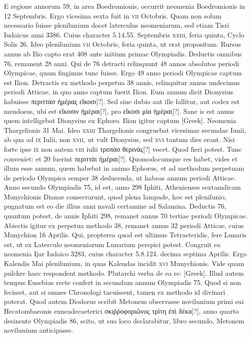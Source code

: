 E regione annorum 59, in area Boedromionis,
occurrit neomenia Boedromionis in 12 Septembris.
Ergo vicesima
sexta fuit in \textsc{vii} Octobris.
Quam non solum necessario fuisse
plenilunium docet laterculus neomeniarum, sed etiam Tisri Iudaicus
anni 3386.
Cuius character 5.14.55. Septembris \textsc{xxiii}, feria quinta,
Cyclo Solis 26.
Ideo plenilunium \textsc{vii} Octobris, feria quinta, ut
erat propositum.
Rursus annus ab Ilio capto erat 408 ante initium
primae Olympiadis.
Deductis omnibus 76, remanent 28 anni.
Qui de 76 detracti relinquunt 48 annos absolutos periodi Olympicae,
quam fingimus tunc fuisse.
Ergo 49 anno periodi Olympicae captum
est Ilion.
Detractis ex methodo perpetua 38 annis, relinquitur annus
undecimus periodi Atticae, in quo anno captum fuerit Ilion.
Eum
annum dicit Dionysius habuisse \textgreek{περιττὰσ ἡμέρας εἴκοσι[?]}.
Sed sine dubio
aut ille fallitur, aut codex est mendosus, ubi est
 \textgreek{εἴκοσιν ἡμέραι[?]}, pro
\textgreek{εἴκοσι μία ἡμέραι[?]}.
Sane is est annus quem intelligebat Dionysius ex
Ephoro.
Ilion igitur captum \textgreek{[Greek]}.
Neomenia Thargelionis 31 Mai.
Ideo \textsc{xxiii} Thargelionis congruebat vicesimae
secundae Iunii, ab qua ad \textsc{ix} Iulii, non \textsc{xvii},
 ut vult Dionysius,
sed \textsc{xvi} tantum dies erant.
Nisi forte ipse \textsc{ix} non autem \textsc{viii} iulii
\textgreek{τροπὰσ θερινὰς[?]} vocet.
Quod fieri potest.
Tunc conveniet: et 20 fuerint
\textgreek{περιττὰι ἡμέραι[?]}.
Quomodocumque res habet, vides et illum esse
annum, quem habebat in animo Ephorus, et ad methodum perpetuam
de periodo Olympica semper 38 deducenda, ut habeas annum
periodi Atticae.
Anno secundo Olympiadis 75, id est, anno 298 Iphiti,
Athenienses sextamdicam Munychionis Dianae consecrarunt,
quod plena lampade, hoc est plenilunio, pugnatum est eo die illius
anni navali certamine ad Salamina.
Deductis 76, quantum potest,
de annis Iphiti 298, remanet annus 70 tertiae periodi Olympicae.
Abiectis igitur ex perpetua methodo 38, remanet annus 32 periodi
Atticae, cuius Munychion 16 Aprilis.
Qui, propterea quod est ultimus
Tetraeteridis, fere Lunaris est, ut ex Laterculo neomeniarum
Lunarium perspici potest.
Congruit ea neomenia Ijar Iudaico 3283,
cuius character 5.8.124. decima septima Aprilis.
Ergo Kalendis
Mai plenilunium, in quas Kalendas incidit \textsc{xvi} Munychionis.
Vide quam pulchre haec respondent methodo.
Plutarchi verba de
ea re: \textgreek{[Greek]}.
Illud autem tempus Eusebius
recte confert in secundum annum Olympiadis 75.
Quod
si non fecisset, aut si omnes Chronologi tacuissent, tamen ex methodo
id divinari poterat.
Quod autem Diodorus scribit Metonem
observasse novilunium primi sui Hecatombaeonis enneadecaeterici
\textgreek{σκιῤῥοφοριῶνος τρίτη ἐπὶ δέκα[?]}, anno quarto desinente
 Olympiadis 86,
scito, ut suo loco declarabitur, libro secundo, Metonem novilunium
anticipasse.

